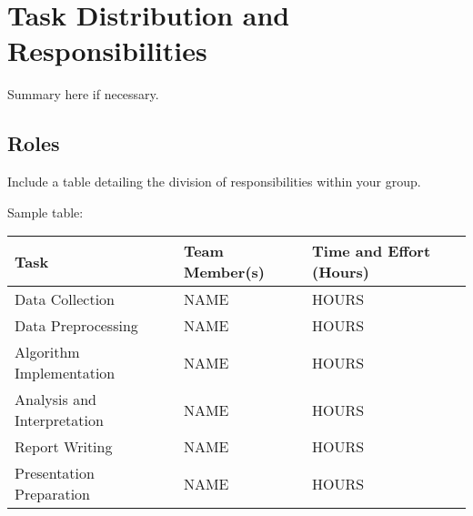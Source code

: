 \chapter{Task Distribution and Responsibilities}
\label{ch:group}

Summary here if necessary.

\section{Roles}
Include a table detailing the division of responsibilities within your group.

Sample table:

\begin{tabularx}{0.8\textwidth} { 
  | >{\centering\arraybackslash}X 
  | >{\centering\arraybackslash}X 
  | >{\centering\arraybackslash}X | }
 \hline
 Task & Team Member(s) & Time and Effort (Hours) \\
 \hline
 Data Collection & NAME & HOURS  \\
  \hline
 Data Preprocessing & NAME & HOURS  \\
  \hline
 Algorithm Implementation & NAME & HOURS  \\
  \hline
 Analysis and Interpretation & NAME & HOURS  \\
  \hline
 Report Writing & NAME & HOURS  \\
  \hline
 Presentation Preparation & NAME & HOURS  \\
\hline
\end{tabularx}